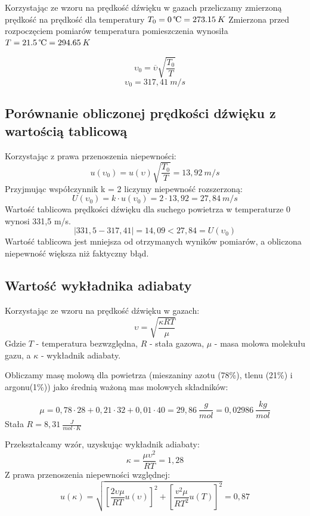 \documentclass[]{article}
\begin{document}
Korzystając ze wzoru na prędkość dźwięku w gazach przeliczamy zmierzoną prędkość na prędkość \newline dla temperatury \(T_0 = 0\:\celsius = 273.15\:K\)
\newline
Zmierzona przed rozpoczęciem pomiarów temperatura pomieszczenia wynosiła \(T=21.5\:\celsius=294.65\:K\)

\[\upsilon_0=\overline\upsilon\sqrt{\frac{T_0}{T}}\]
\[\upsilon_0=317,41\:m/s\]

\subsection{Porównanie obliczonej prędkości dźwięku z wartością tablicową}
Korzystając z prawa przenoszenia niepewności:
\[u(\upsilon_0)=u(\upsilon)\sqrt{\frac{T_0}{T}}=13,92\:m/s\]
Przyjmując współczynnik k = 2 liczymy niepewność rozszerzoną:
\[U(\upsilon_0)=k \cdot u(\upsilon_0)=2 \cdot 13,92=27,84\:m/s\]
Wartość tablicowa prędkości dźwięku dla suchego powietrza w temperaturze 0\celsius\vspace{} wynosi 331,5 m/s.
\[|331,5-317,41|=14,09<27,84=U(\upsilon_0)\]
\newline
Wartość tablicowa jest mniejsza od otrzymanych wyników pomiarów, a obliczona niepewność większa niż faktyczny błąd.


\subsection{Wartość wykładnika adiabaty}
Korzystając ze wzoru na prędkość dźwięku w gazach:
\[\upsilon=\sqrt{\frac{\kappa RT}{\mu}}\]
Gdzie \(T\) - temperatura bezwzględna, \(R\) - stała gazowa, \(\mu\) - masa molowa molekułu gazu, a \(\kappa\) - wykładnik adiabaty.\newline \newline


Obliczamy masę molową dla powietrza (mieszaniny azotu (78\%), tlenu (21\%) i argonu(1\%)) jako
średnią ważoną mas molowych składników:

\[\mu=0,78 \cdot 28 + 0,21 \cdot 32 + 0,01 \cdot 40 = 29,86\:\frac{g}{mol} = 0,02986\:\frac{kg}{mol}\]
Stała \(R=8,31\:\frac{J}{mol\cdot K}\) \newline \newline

Przekształcamy wzór, uzyskując wykładnik adiabaty:
\[\kappa=\frac{\mu \upsilon^2}{RT}=1,28\] \newline
Z prawa przenoszenia niepewności względnej:
\[u(\kappa)=\sqrt{[\frac{2\upsilon \mu}{RT}u(\upsilon)]^2+[\frac{v^2\mu}{RT^2}u(T)]^2}=0,87\]
\newpage
\end{document}
